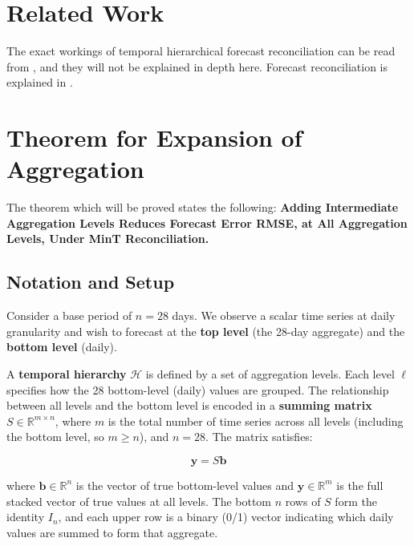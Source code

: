 \documentclass[sn-basic,Numbered,iicol]{sn-jnl}
\theoremstyle{thmstyleone}%
\theoremstyle{thmstyletwo}%
\theoremstyle{thmstylethree}%
\begin{document}

\section{Related Work}\label{sec2}

The exact workings of temporal hierarchical forecast reconciliation can be read from \cite{hyndmanforecasting}, and they will not be explained in depth here. Forecast reconciliation is explained in \cite{hyndmanmint}.


\section{Theorem for Expansion of Aggregation}\label{sec3}

The theorem which will be proved states the following: \textbf{Adding Intermediate Aggregation Levels Reduces Forecast Error RMSE, at All Aggregation Levels, Under MinT Reconciliation.}

\subsection{Notation and Setup}\label{subsec:notation}

Consider a base period of $n = 28$ days. We observe a scalar time series at daily granularity and wish to forecast at the \textbf{top level} (the 28-day aggregate) and the \textbf{bottom level} (daily).

A \textbf{temporal hierarchy} $\mathcal{H}$ is defined by a set of aggregation levels. Each level $\ell$ specifies how the 28 bottom-level (daily) values are grouped. The relationship between all levels and the bottom level is encoded in a \textbf{summing matrix} $S \in \mathbb{R}^{m \times n}$, where $m$ is the total number of time series across all levels (including the bottom level, so $m \geq n$), and $n = 28$. The matrix satisfies:

\begin{equation}
\mathbf{y} = S \mathbf{b}
\end{equation}

where $\mathbf{b} \in \mathbb{R}^n$ is the vector of true bottom-level values and $\mathbf{y} \in \mathbb{R}^m$ is the full stacked vector of true values at all levels. The bottom $n$ rows of $S$ form the identity $I_n$, and each upper row is a binary (0/1) vector indicating which daily values are summed to form that aggregate.
\end{document}
